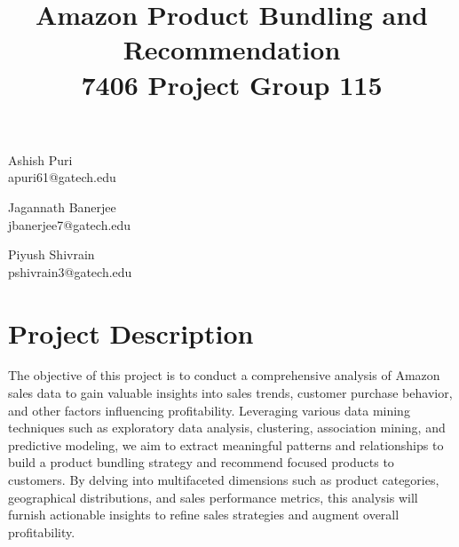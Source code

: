 \documentclass[11pt]{article} %
\title{\textbf{Amazon Product Bundling and Recommendation \\7406 Project Group 115}}
\date{}
\begin{document}
\maketitle
\begin{center}
\begin{minipage}{0.33\textwidth}
    \centering
    {\Large Ashish Puri} \\
    apuri61@gatech.edu \\
\end{minipage}%
\begin{minipage}{0.33\textwidth}
    \centering
    {\Large Jagannath Banerjee} \\
    jbanerjee7@gatech.edu \\
\end{minipage}
\begin{minipage}{0.33\textwidth}
    \centering
    {\Large Piyush Shivrain} \\
    pshivrain3@gatech.edu \\
\end{minipage}
\end{center}

\section{Project Description}
The objective of this project is to conduct a comprehensive analysis of Amazon sales data to gain valuable insights into sales trends, customer purchase behavior, and other factors influencing profitability. Leveraging various data mining techniques such as exploratory data analysis, clustering, association mining, and predictive modeling, we aim to extract meaningful patterns and relationships to build a product bundling strategy and recommend focused products to customers. By delving into multifaceted dimensions such as product categories, geographical distributions, and sales performance metrics, this analysis will furnish actionable insights to refine sales strategies and augment overall profitability.
\end{document}
